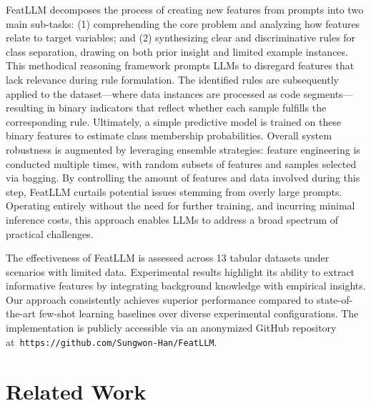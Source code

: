 \textsf{FeatLLM} decomposes the process of creating new features from prompts into two main sub-tasks: (1) comprehending the core problem and analyzing how features relate to target variables; and (2) synthesizing clear and discriminative rules for class separation, drawing on both prior insight and limited example instances. This methodical reasoning framework prompts LLMs to disregard features that lack relevance during rule formulation. The identified rules are subsequently applied to the dataset—where data instances are processed as code segments—resulting in binary indicators that reflect whether each sample fulfills the corresponding rule. Ultimately, a simple predictive model is trained on these binary features to estimate class membership probabilities. Overall system robustness is augmented by leveraging ensemble strategies: feature engineering is conducted multiple times, with random subsets of features and samples selected via bagging. By controlling the amount of features and data involved during this step, \textsf{FeatLLM} curtails potential issues stemming from overly large prompts. Operating entirely without the need for further training, and incurring minimal inference costs, this approach enables LLMs to address a broad spectrum of practical challenges.

The effectiveness of \textsf{FeatLLM} is assessed across 13 tabular datasets under scenarios with limited data. Experimental results highlight its ability to extract informative features by integrating background knowledge with empirical insights. Our approach consistently achieves superior performance compared to state-of-the-art few-shot learning baselines over diverse experimental configurations. The implementation is publicly accessible via an anonymized GitHub repository at~\texttt{https://github.com/Sungwon-Han/FeatLLM}.

\section{Related Work}

